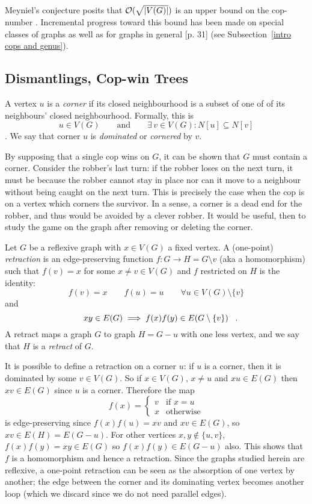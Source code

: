 Meyniel's conjecture posits that $\mathcal{O}(\sqrt{\lvert V(G)\rvert })$ is an upper bound on the cop-number \cite{frankl1987cops}.
Incremental progress toward this bound has been made on special classes of graphs as well as for graphs in general  \cite{gera2016graph}[p. 31] (see Subsection~\ref{intro cops and genus}).

\subsection{Dismantlings, Cop-win Trees \label{intro dismantlings}}

A vertex $u$ is a \textit{corner} if its closed neighbourhood
is a subset of one of of its neighbours' closed neighbourhood. Formally, this is
\[u \in V(G) \qquad \text{and} \qquad \exists \, v\in V(G) : N[u] \subseteq N[v] \].
We say that corner $u$ is \textit{dominated} or \textit{cornered} by $v$.

By supposing that a single cop wins on $G$, it can be shown that $G$ must contain a corner. Consider the robber's last turn: if the robber loses on the next turn, it must be because the robber cannot stay in place nor can it move to a neighbour without being caught on the next turn. This is precisely the case when the cop is on a vertex which corners the survivor. In a sense, a corner is a dead end for the robber, and thus would be avoided by a clever robber. It would be useful, then to study the game on the graph after removing or deleting the corner.

Let $G$ be a reflexive graph with $x\in V(G)$ a fixed vertex. A (one-point) \textit{retraction} is an edge-preserving function $f : G \rightarrow H = G \setminus v$
(aka a homomorphism) such that $f(v) = x$ for some $x \neq v \in V(G)$ and $f$ restricted on $H$ is the identity:
\[ f(v) = x \qquad f(u) = u \qquad \forall u \in V(G)\setminus \{ v \} \]
and
\[ xy \in E(G) \implies f(x)f(y) \in E(G \setminus \{ v \}) \mperiod \]
A retract maps a graph $G$ to graph $H = G - u$ with one less vertex, and we say that $H$ is a \textit{retract} of $G$.

It is possible to define a retraction on a corner $u$: if $u$ is a corner, then it is
dominated by some $v \in V(G)$. So if $x \in V(G)$, $x \neq u$ and
$xu \in E(G)$ then $xv \in E(G)$ since $u$ is a corner. Therefore the map
\[ f(x) = \begin{cases}
v & \text{if } x = u \\
x & \text{otherwise}
\end{cases} \]
is edge-preserving since $f(x)f(u) = xv$ and $xv \in E(G)$, so $xv \in E(H) = E(G - u)$.
For other vertices $x,y \not\in \{u,v\}$, $f(x)f(y) = xy \in E(G)$ so $f(x)f(y) \in E(G- u)$ also.
This shows that $f$ is a homomorphism and hence a retraction. Since the graphs studied herein are reflexive, a one-point retraction can be seen as the absorption of one vertex by another; the edge between the corner and its dominating vertex becomes another loop (which we discard since we do not need parallel edges).

